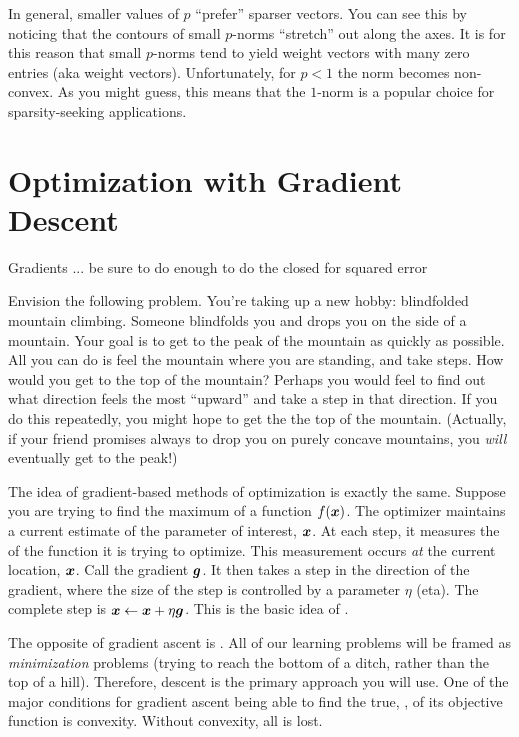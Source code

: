 
In general, smaller values of $p$ ``prefer'' sparser vectors.  You can
see this by noticing that the contours of small $p$-norms ``stretch''
out along the axes.  It is for this reason that small $p$-norms tend
to yield weight vectors with many zero entries (aka 
weight vectors).  Unfortunately, for $p<1$ the norm becomes
non-convex.  As you might guess, this means that the $1$-norm is a
popular choice for sparsity-seeking applications.

\section{Optimization with Gradient Descent}

\begin{mathreview}{Gradients}
  ... be sure to do enough to do the closed for squared error
\end{mathreview}

Envision the following problem.  You're taking up a new hobby:
blindfolded mountain climbing.  Someone blindfolds you and drops you
on the side of a mountain.  Your goal is to get to the peak of the
mountain as quickly as possible.  All you can do is feel the mountain
where you are standing, and take steps.  How would you get to the top
of the mountain?  Perhaps you would feel to find out what direction
feels the most ``upward'' and take a step in that direction.  If you
do this repeatedly, you might hope to get the the top of the mountain.
(Actually, if your friend promises always to drop you on purely
concave mountains, you \emph{will} eventually get to the peak!)

The idea of gradient-based methods of optimization is exactly the
same.  Suppose you are trying to find the maximum of a function
$f({\boldsymbol{x}})$.  The optimizer maintains a current estimate of the parameter
of interest, ${\boldsymbol{x}}$.  At each step, it measures the 
of the function it is trying to optimize.  This measurement occurs
\emph{at} the current location, ${\boldsymbol{x}}$.  Call the gradient ${\boldsymbol{g}}$.  It
then takes a step in the direction of the gradient, where the size of
the step is controlled by a parameter $\eta$ (eta).  The complete step
is ${\boldsymbol{x}} \leftarrow {\boldsymbol{x}} + \eta {\boldsymbol{g}}$.  This is the basic idea of
.

The opposite of gradient ascent is .  All of
our learning problems will be framed as \emph{minimization} problems
(trying to reach the bottom of a ditch, rather than the top of a
hill).  Therefore, descent is the primary approach you will use.
One of the major conditions for gradient ascent being able to find the
true, , of its objective function is
convexity.  Without convexity, all is lost.


